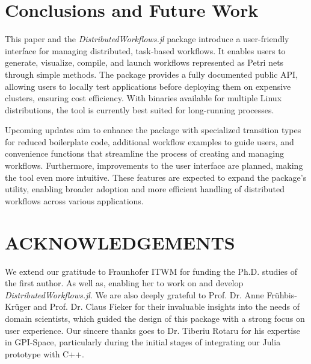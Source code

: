 \documentclass{juliacon}
\begin{document}
\section{Conclusions and Future Work}
\label{sec:conclusions_and_future_work}

This paper and the \emph{DistributedWorkflows.jl} package introduce a user-friendly interface for managing distributed, task-based workflows. 
It enables users to generate, visualize, compile, and launch workflows represented as Petri nets through simple methods. 
The package provides a fully documented public API, allowing users to locally test applications before deploying them on expensive clusters, ensuring cost efficiency. 
With binaries available for multiple Linux distributions, the tool is currently best suited for long-running processes.\vskip 6pt

Upcoming updates aim to enhance the package with specialized transition types for reduced boilerplate code, additional workflow examples to guide users, and convenience functions that streamline the process of creating and managing workflows. 
Furthermore, improvements to the user interface are planned, making the tool even more intuitive. 
These features are expected to expand the package's utility, enabling broader adoption and more efficient handling of distributed workflows across various applications.


\section{ACKNOWLEDGEMENTS}
\label{sec:acknowledgements}

We extend our gratitude to Fraunhofer ITWM for funding the Ph.D. studies of the first author. 
As well as, enabling her to work on and develop \emph{DistributedWorkflows.jl}. 
We are also deeply grateful to Prof. Dr. Anne Fr\"uhbis-Kr\"uger and Prof. Dr. Claus Fieker for their invaluable insights into the needs of domain scientists, which guided the design of this package with a strong focus on user experience. 
Our sincere thanks goes to Dr. Tiberiu Rotaru for his expertise in GPI-Space, particularly during the initial stages of integrating our Julia prototype with C++.


\end{document}
